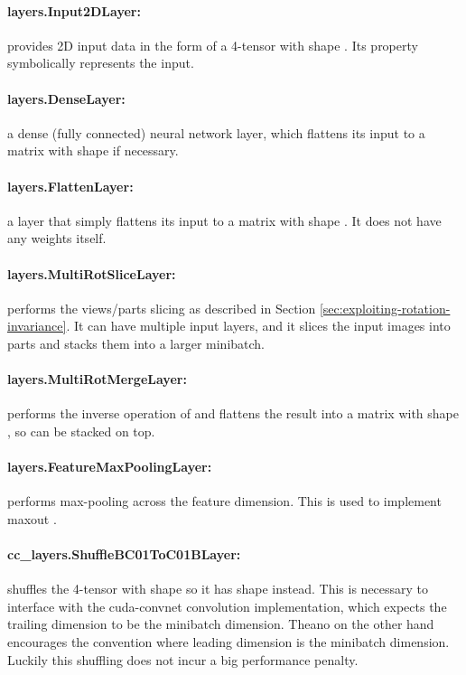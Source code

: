 \documentclass[a4paper,10pt]{article}
\begin{document}
\paragraph{layers.Input2DLayer:} provides 2D input data in the form of a 4-tensor with shape . Its property  symbolically represents the input.

\paragraph{layers.DenseLayer:} a dense (fully connected) neural network layer, which flattens its input to a matrix with shape  if necessary.

\paragraph{layers.FlattenLayer:} a layer that simply flattens its input to a matrix with shape . It does not have any weights itself.

\paragraph{layers.MultiRotSliceLayer:} performs the views/parts slicing as described in Section \ref{sec:exploiting-rotation-invariance}. It can have multiple input layers, and it slices the input images into parts and stacks them into a larger minibatch.

\paragraph{layers.MultiRotMergeLayer:} performs the inverse operation of  and flattens the result into a matrix with shape , so  can be stacked on top.

\paragraph{layers.FeatureMaxPoolingLayer:} performs max-pooling across the feature dimension. This is used to implement maxout \cite{goodfellow2013maxout}.

\paragraph{cc\_layers.ShuffleBC01ToC01BLayer:} shuffles the 4-tensor with shape  so it has shape  instead. This is necessary to interface with the cuda-convnet convolution implementation, which expects the trailing dimension to be the minibatch dimension. Theano on the other hand encourages the convention where leading dimension is the minibatch dimension. Luckily this shuffling does not incur a big performance penalty.
\end{document}
